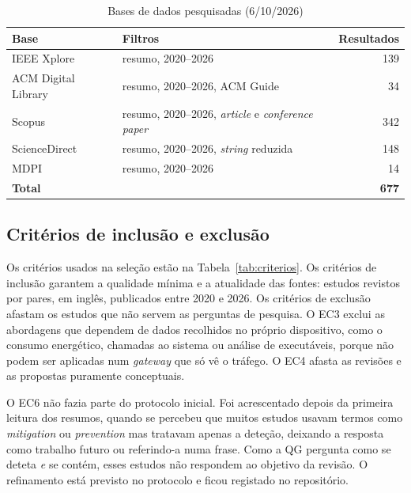 \documentclass[conference,a4paper]{IEEEtran}
\begin{document}
\begin{table}[H]
\caption{Bases de dados pesquisadas (6/10/2026)}\label{tab:bases}
\centering\footnotesize
\begin{tabular}{@{}p{}p{}r@{}}
\toprule
Base & Filtros & Resultados \\
\midrule
IEEE Xplore         & resumo, 2020--2026 & 139 \\
ACM Digital Library & resumo, 2020--2026, ACM Guide & 34 \\
Scopus              & resumo, 2020--2026, \textit{article} e \textit{conference paper} & 342 \\
ScienceDirect       & resumo, 2020--2026, \textit{string} reduzida & 148 \\
MDPI                & resumo, 2020--2026 & 14 \\
\midrule
\textbf{Total}      & & \textbf{677} \\
\bottomrule
\end{tabular}
\end{table}

\subsection{Critérios de inclusão e exclusão}
Os critérios usados na seleção estão na Tabela~\ref{tab:criterios}. Os critérios de
inclusão garantem a qualidade mínima e a atualidade das fontes: estudos revistos por
pares, em inglês, publicados entre 2020 e 2026. Os critérios de exclusão afastam os
estudos que não servem as perguntas de pesquisa. O EC3 exclui as abordagens que dependem
de dados recolhidos no próprio dispositivo, como o consumo energético, chamadas ao
sistema ou análise de executáveis, porque não podem ser aplicadas num \textit{gateway}
que só vê o tráfego. O EC4 afasta as revisões e as propostas puramente conceptuais.

O EC6 não fazia parte do protocolo inicial. Foi acrescentado depois da primeira leitura
dos resumos, quando se percebeu que muitos estudos usavam termos como
\textit{mitigation} ou \textit{prevention} mas tratavam apenas a deteção, deixando a
resposta como trabalho futuro ou referindo-a numa frase. Como a QG pergunta como se
deteta \emph{e} se contém, esses estudos não respondem ao objetivo da revisão. O
refinamento está previsto no protocolo e ficou registado no repositório.
\end{document}
